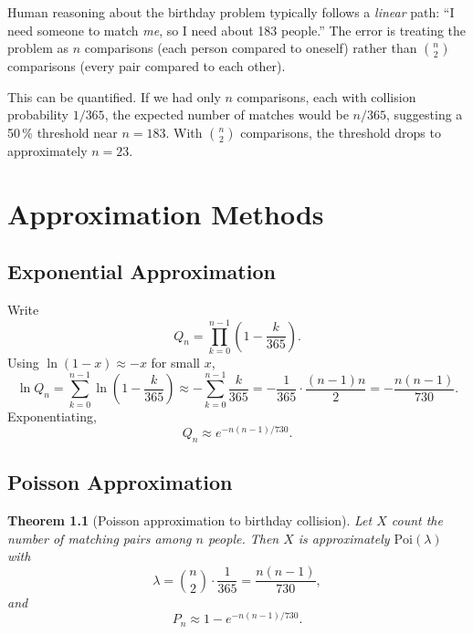 \documentclass[12pt]{report}
\newtheorem{theorem}{Theorem}[chapter]
\theoremstyle{definition}
\begin{document}
Human reasoning about the birthday problem typically follows a \emph{linear} path:
``I need someone to match \emph{me}, so I need about 183 people.''  The error is
treating the problem as $n$ comparisons (each person compared to oneself) rather than
$\binom{n}{2}$ comparisons (every pair compared to each other).

This can be quantified.  If we had only $n$ comparisons, each with collision probability
$1/365$, the expected number of matches would be $n/365$, suggesting a 50\,\% threshold
near $n = 183$.  With $\binom{n}{2}$ comparisons, the threshold drops to approximately
$n = 23$.

\chapter{Approximation Methods}

\section{Exponential Approximation}

Write
\[
  Q_n = \prod_{k=0}^{n-1}\left(1 - \frac{k}{365}\right).
\]
Using $\ln(1-x) \approx -x$ for small $x$,
\[
  \ln Q_n = \sum_{k=0}^{n-1} \ln\!\left(1-\frac{k}{365}\right)
           \approx -\sum_{k=0}^{n-1}\frac{k}{365}
           = -\frac{1}{365}\cdot\frac{(n-1)n}{2}
           = -\frac{n(n-1)}{730}.
\]
Exponentiating,
\begin{equation}\label{eq:exp_approx}
  Q_n \approx e^{-n(n-1)/730}.
\end{equation}

\section{Poisson Approximation}

\begin{theorem}[Poisson approximation to birthday collision]
\label{thm:poisson}
  Let $X$ count the number of matching pairs among $n$ people.  Then $X$ is
  approximately $\mathrm{Poi}(\lambda)$ with
  \[
    \lambda = \binom{n}{2}\cdot\frac{1}{365} = \frac{n(n-1)}{730},
  \]
  and
  \begin{equation}\label{eq:poisson_approx}
    \boxed{P_n \approx 1 - e^{-n(n-1)/730}.}
  \end{equation}
\end{theorem}
\end{document}

